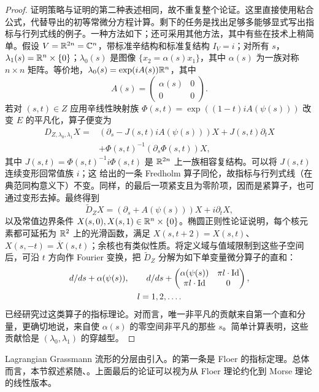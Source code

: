 \begin{proof}
证明策略与证明的第二种表述相同，故不重复整个论证。这里直接使用粘合公式，代替导出的初等常微分方程计算。剩下的任务是找出足够多能够显式写出指标与行列式线的例子。一种方法如下；还可采用其他方法，其中有些在技术上稍简单。假设 $V=\mathbb R^{2n}=\mathbb C^n$，带标准辛结构和标准复结构 $I_V=i$；对所有 $s$，$\lambda_1(s)=\mathbb R^n\times\{0\}$；$\lambda_0(s)$ 是图像 $\{x_2=\alpha(s)x_1\}$，其中 $\alpha(s)$ 为一族对称 $n\times n$ 矩阵。等价地，$\lambda_0(s)=\exp(iA(s))\mathbb R^n$，其中
\[
A(s)=\begin{pmatrix}\alpha(s)&0\\0&0\end{pmatrix}.
\]
若对 $(s,\allowbreak t)\in Z$ 应用辛线性映射族 $\Phi(s,\allowbreak t)=\exp((1-t)iA(\psi(s)))$ 改变 $E$ 的平凡化，算子便变为
\begin{equation}\label{eq:11.18}
\begin{aligned}
D_{Z,\lambda_0,\lambda_1}X={}&(\partial_s-J(s,t)iA(\psi(s)))X+J(s,t)\partial_tX\\
&+\Phi(s,t)^{-1}(\partial_s\Phi(s,t))X,
\end{aligned}
\end{equation}
其中 $J(s,\allowbreak t)=\Phi(s,\allowbreak t)^{-1}i\Phi(s,\allowbreak t)$ 是 $\mathbb R^{2n}$ 上一族相容复结构。可以将 $J(s,\allowbreak t)$ 连续变形回常值族 $i$；这
给出的一条 Fredholm 算子同伦，故指标与行列式线（在典范同构意义下）不变。同样，的最后一项紧支且为零阶项，因而是紧算子，也可通过变形去掉。最终得到
\[
\widetilde D_ZX=(\partial_s+A(\psi(s)))X+i\partial_tX,
\]
以及常值边界条件 $X(s,\allowbreak 0),\allowbreak X(s,\allowbreak 1)\in\mathbb R^n\times\{0\}$。椭圆正则性论证说明，每个核元素都可延拓为 $\mathbb R^2$ 上的光滑函数，满足 $X(s,\allowbreak t+2)=X(s,\allowbreak t)$、$X(s,\allowbreak -t)=\overline{X}(s,\allowbreak t)$；余核也有类似性质。将定义域与值域限制到这些子空间后，可沿 $t$ 方向作 Fourier 变换，把 $\widetilde D_Z$ 分解为如下单变量微分算子的直和：
\begin{equation}\label{eq:11.19}
\begin{gathered}
d/ds+\alpha(\psi(s)),\qquad
d/ds+\begin{pmatrix}\alpha(\psi(s))&\pi l\cdot\operatorname{Id}\\\pi l\cdot\operatorname{Id}&0\end{pmatrix},\\
l=1,2,\ldots.
\end{gathered}
\end{equation}
已经研究过这类算子的指标理论。对而言，唯一非平凡的贡献来自第一个直和分量，更确切地说，来自使 $\alpha(s)$ 的零空间非平凡的那些 $s$。简单计算表明，这些贡献恰是 $(\lambda_0,\allowbreak \lambda_1)$ 的穿越型。
\end{proof}
\begin{note}\label{st:11.10}
Lagrangian Grassmann 流形的分层由引入。的第一条是 Floer 的指标定理。总体而言，本节叙述紧随、。上面最后的论证可以视为从 Floer 理论约化到 Morse 理论的线性版本。
\end{note}
